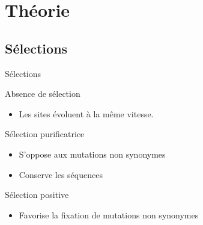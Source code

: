 \section{Théorie}
\begin{frame}
	\tableofcontents[sectionstyle=show/shaded,subsectionstyle=show/show/hide,subsubsectionstyle=show/show/hide]
\end{frame}

\subsection{Sélections}
\begin{frame}{Sélections}
	\begin{block}{Absence de sélection}
        \begin{itemize}
            \item Les sites évoluent à la même vitesse.
        \end{itemize}
    \end{block}

 
    \pause
    \begin{block}{Sélection purificatrice}
        \begin{itemize}
            \item S'oppose aux mutations non synonymes
            \item Conserve les séquences
        \end{itemize}
    \end{block}

    \pause
    \begin{block}{Sélection positive}
        \begin{itemize}
            \item Favorise la fixation de mutations non synonymes
        \end{itemize}
    \end{block}
    
\end{frame}


